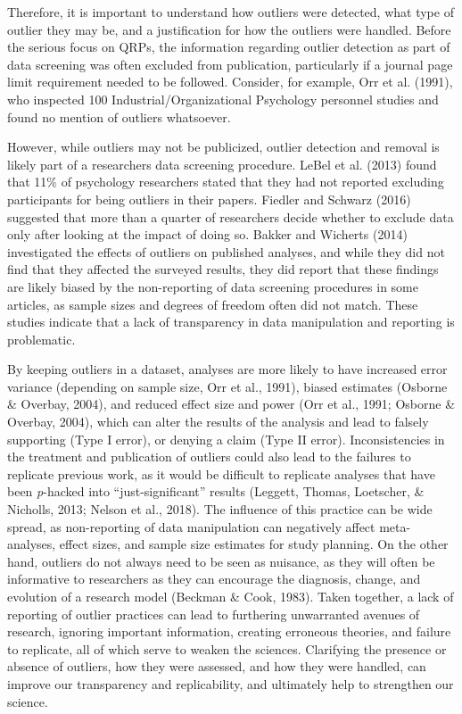 \documentclass[english,,man]{apa6}
\begin{document}
Therefore, it is important to understand how outliers were detected, what type of outlier they may be, and a justification for how the outliers were handled. Before the serious focus on QRPs, the information regarding outlier detection as part of data screening was often excluded from publication, particularly if a journal page limit requirement needed to be followed. Consider, for example, Orr et al. (1991), who inspected 100 Industrial/Organizational Psychology personnel studies and found no mention of outliers whatsoever.

However, while outliers may not be publicized, outlier detection and removal is likely part of a researchers data screening procedure. LeBel et al. (2013) found that 11\% of psychology researchers stated that they had not reported excluding participants for being outliers in their papers. Fiedler and Schwarz (2016) suggested that more than a quarter of researchers decide whether to exclude data only after looking at the impact of doing so. Bakker and Wicherts (2014) investigated the effects of outliers on published analyses, and while they did not find that they affected the surveyed results, they did report that these findings are likely biased by the non-reporting of data screening procedures in some articles, as sample sizes and degrees of freedom often did not match. These studies indicate that a lack of transparency in data manipulation and reporting is problematic.

By keeping outliers in a dataset, analyses are more likely to have increased error variance (depending on sample size, Orr et al., 1991), biased estimates (Osborne \& Overbay, 2004), and reduced effect size and power (Orr et al., 1991; Osborne \& Overbay, 2004), which can alter the results of the analysis and lead to falsely supporting (Type I error), or denying a claim (Type II error). Inconsistencies in the treatment and publication of outliers could also lead to the failures to replicate previous work, as it would be difficult to replicate analyses that have been \emph{p}-hacked into \enquote{just-significant} results (Leggett, Thomas, Loetscher, \& Nicholls, 2013; Nelson et al., 2018). The influence of this practice can be wide spread, as non-reporting of data manipulation can negatively affect meta-analyses, effect sizes, and sample size estimates for study planning. On the other hand, outliers do not always need to be seen as nuisance, as they will often be informative to researchers as they can encourage the diagnosis, change, and evolution of a research model (Beckman \& Cook, 1983). Taken together, a lack of reporting of outlier practices can lead to furthering unwarranted avenues of research, ignoring important information, creating erroneous theories, and failure to replicate, all of which serve to weaken the sciences. Clarifying the presence or absence of outliers, how they were assessed, and how they were handled, can improve our transparency and replicability, and ultimately help to strengthen our science.
\end{document}
